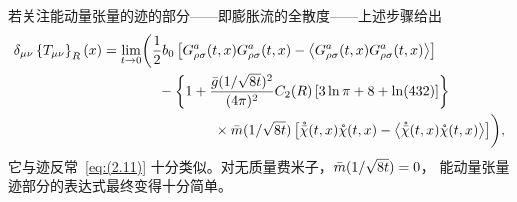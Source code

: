 若关注能动量张量的迹的部分——即膨胀流的全散度——上述步骤给出
\begin{align}
   \delta_{\mu\nu}\left\{T_{\mu\nu}\right\}_R(x)
   &=\lim_{t\to0}
   \biggl(\frac{1}{2}b_0
   \left[
   G_{\rho\sigma}^a(t,x)G_{\rho\sigma}^a(t,x)
   -\left\langle G_{\rho\sigma}^a(t,x)G_{\rho\sigma}^a(t,x)\right\rangle
   \right]
\notag\\
   &\qquad\qquad{}
   -\left\{1+\frac{\Bar{g}(1/\sqrt{8t})^2}{(4\pi)^2}C_2(R)
   \left[3\ln\pi+8+\ln(432)\right]\right\}
\notag\\
   &\qquad\qquad\qquad\qquad{}
   \times\Bar{m}(1/\sqrt{8t})\left[
   \mathring{\Bar{\chi}}(t,x)\mathring{\chi}(t,x)
   -\left\langle
   \mathring{\Bar{\chi}}(t,x)\mathring{\chi}(t,x)\right\rangle
   \right]
   \biggr),
\label{eq:(5.7)}
\end{align}
它与迹反常~\eqref{eq:(2.11)} 十分类似。对无质量费米子，$\Bar{m}(1/\sqrt{8t})=0$，
能动量张量迹部分的表达式最终变得十分简单。
